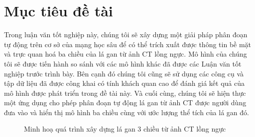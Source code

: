 \section{Mục tiêu đề tài}
Trong luận văn tốt nghiệp này, chúng tôi sẽ xây dựng một giải pháp phân đoạn tự động trên cơ sở của mạng học sâu để có thể trích xuất được thông tin bề mặt và trực quan hoá ba chiều của lá gan từ ảnh CT lồng ngực. Mô hình của chúng tôi sẽ được tiến hành so sánh với các mô hình khác đã được các Luận văn tốt nghiệp trước trình bày. Bên cạnh đó chúng tôi cũng sẽ sử dụng các công cụ và tập dữ liệu đã được công khai có tính khách quan cao để đánh giá kết quả của mô hình được phát triển trong đề tài này. Và cuối cùng, chúng tôi sẽ hiện thực một ứng dụng cho phép phân đoạn tự động lá gan từ ảnh CT được người dùng đưa vào và hiển thị mô hình ba chiều cùng với ước lượng thể tích của lá gan đó.

\begin{figure}
  \centering
  \caption{Minh hoạ quá trình xây dựng lá gan 3 chiều từ ảnh CT lồng ngực}
  \label{fig:ab}
\end{figure}


